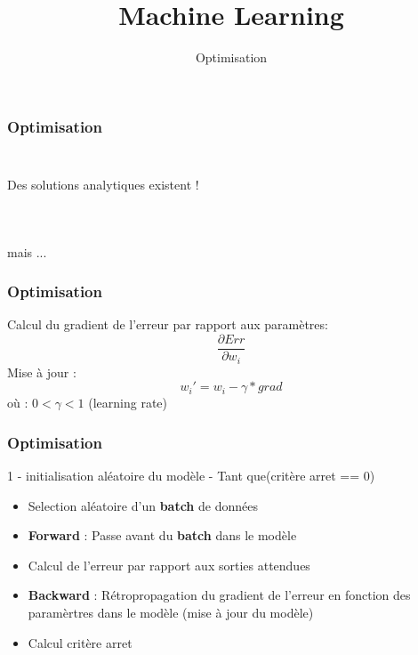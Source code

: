 \documentclass{formation}
\title{Machine Learning}
\subtitle{Optimisation}
\begin{document}
\maketitle

\begin{frame}
  \frametitle{Optimisation}
  \begin{center}
    $\;$
  \end{center}
  \begin{center}
    $\;$
  \end{center}
  \begin{center}
    \huge{Des solutions analytiques existent !}
  \end{center}
  \begin{center}
    $\;$
  \end{center}
  \begin{center}
    $\;$
  \end{center}
  \begin{center}
    $\;$
  \end{center}
  \begin{center}
    \normalsize{mais ...}
  \end{center}
\end{frame}

\begin{frame}
  \frametitle{Optimisation}
  Calcul du gradient de l'erreur par rapport aux paramètres:
  \[
  \frac{\partial{Err}}{\partial{w_i}}
  \]
  Mise à jour :
  \[
  w_i' = w_i - \gamma * grad 
  \]
  où : $0 < \gamma < 1$ (learning rate)
\end{frame}

\begin{frame}
  \frametitle{Optimisation}
  1 - initialisation aléatoire du modèle
   - Tant que(critère arret == 0)
  \begin{itemize}
  \item Selection aléatoire d'un \textbf{batch} de données
  \item \textbf{Forward} : Passe avant du \textbf{batch} dans le modèle
  \item Calcul de l'erreur par rapport aux sorties attendues
  \item \textbf{Backward} : Rétropropagation du gradient de l'erreur en fonction des paramèrtres dans le modèle (mise à jour du modèle)
  \item Calcul critère arret
  \end{itemize}
\end{frame}
\end{document}
